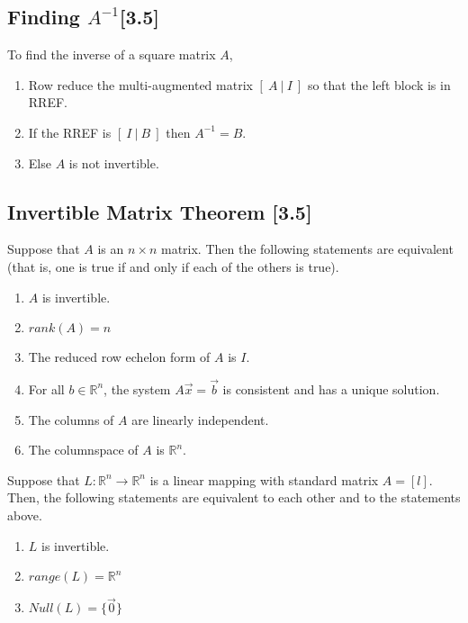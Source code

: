 \documentclass[a4paper,9pt]{extarticle}
\begin{document}
\begin{multicols*}{2}

\subsection{Finding $A^{-1}$[3.5]}
To find the inverse of a square matrix $A$,
\begin{enumerate}[label=\bfseries (\arabic*)] \itemsep0pt \parskip0pt 
    \item Row reduce the multi-augmented matrix $[ \> A \> | \> I \> ]$ so that the left block is in RREF.
    \item If the RREF is $[ \> I \> | \> B \> ]$ then $A^{-1} = B$.
    \item Else $A$ is not invertible.
\end{enumerate}


\subsection{Invertible Matrix Theorem [3.5]}
Suppose that $A$ is an $n \times n$ matrix. Then the following statements are equivalent (that is, one is true if and only if each of the others is true).

\begin{enumerate}[label=\bfseries (\arabic*)] \itemsep0pt \parskip0pt 
    \item $A$ is invertible.
    \item $rank(A) = n$
    \item The reduced row echelon form of $A$ is $I$.
    \item For all $b \in \mathbb{R}^n$, the system $A \vec{x} = \vec{b}$ is consistent and has a unique solution.
    \item The columns of $A$ are linearly independent.
    \item The columnspace of $A$ is $\mathbb{R}^n$.
\end{enumerate}

Suppose that $L: \mathbb{R}^n \to \mathbb{R}^n$ is a linear mapping with standard matrix $A = [l]$. Then, the following statements are equivalent to each other and to the statements above.

\begin{enumerate}[label=\bfseries (\arabic*)] \itemsep0pt \parskip0pt 
    \setcounter{enumi}{6}
    \item $L$ is invertible.
    \item $range(L) = \mathbb{R}^n$
    \item $Null(L) = \{\vec{0}\}$
\end{enumerate}


\end{multicols*}
\end{document}
